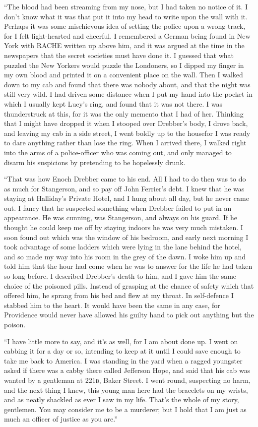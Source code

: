 \documentclass[12pt,english]{book}
\newcommand{\noun}[1]{\textsc{#1}}
\begin{document}
{}``The blood had been streaming from my nose, but I had taken no
notice of it. I don't know what it was that put it into my head to
write upon the wall with it. Perhaps it was some mischievous idea
of setting the police upon a wrong track, for I felt light-hearted
and cheerful. I remembered a German being found in New York with RACHE
written up above him, and it was argued at the time in the newspapers
that the secret societies must have done it. I guessed that what puzzled
the New Yorkers would puzzle the Londoners, so I dipped my finger
in my own blood and printed it on a convenient place on the wall.
Then I walked down to my cab and found that there was nobody about,
and that the night was still very wild. I had driven some distance
when I put my hand into the pocket in which I usually kept Lucy's
ring, and found that it was not there. I was thunderstruck at this,
for it was the only memento that I had of her. Thinking that I might
have dropped it when I stooped over Drebber's body, I drove back,
and leaving my cab in a side street, I went boldly up to the house\mdsh{---}for
I was ready to dare anything rather than lose the ring. When I arrived
there, I walked right into the arms of a police-officer who was coming
out, and only managed to disarm his suspicions by pretending to be
hopelessly drunk.

{}``That was how Enoch Drebber came to his end. All I had to do then
was to do as much for Stangerson, and so pay off John Ferrier's debt.
I knew that he was staying at Halliday's Private Hotel, and I hung
about all day, but he never came out. I fancy that he suspected something
when Drebber failed to put in an appearance. He was cunning, was Stangerson,
and always on his guard. If he thought he could keep me off by staying
indoors he was very much mistaken. I soon found out which was the
window of his bedroom, and early next morning I took advantage of
some ladders which were lying in the lane behind the hotel, and so
made my way into his room in the grey of the dawn. I woke him up and
told him that the hour had come when he was to answer for the life
he had taken so long before. I described Drebber's death to him, and
I gave him the same choice of the poisoned pills. Instead of grasping
at the chance of safety which that offered him, he sprang from his
bed and flew at my throat. In self-defence I stabbed him to the heart.
It would have been the same in any case, for Providence would never
have allowed his guilty hand to pick out anything but the poison.

{}``I have little more to say, and it's as well, for I am about done
up. I went on cabbing it for a day or so, intending to keep at it
until I could save enough to take me back to America. I was standing
in the yard when a ragged youngster asked if there was a cabby there
called Jefferson Hope, and said that his cab was wanted by a gentleman
at \noun{221b}, Baker Street. I went round, suspecting no harm,
and the next thing I knew, this young man here had the bracelets on
my wrists, and as neatly shackled as ever I saw in my life. That's
the whole of my story, gentlemen. You may consider me to be a murderer;
but I hold that I am just as much an officer of justice as you are.''
\end{document}
